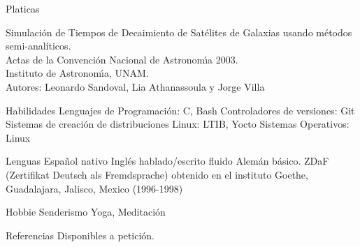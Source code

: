 \documentclass{resume}
\begin{document}
\begin{category}{Platicas}

\citembullet Simulaci\'on de Tiempos de Decaimiento de Sat\'elites de Galaxias usando m\'etodos semi-anal\'{i}ticos.\\
Actas de la Convenci\'on Nacional de Astronom\'{\i}a 2003.\\
Instituto de Astronom\'{\i}a, UNAM. \\
Autores: Leonardo Sandoval, Lia Athanassoula y Jorge Villa
\end{category}

\begin{category}{Habilidades}
\citembullet Lenguajes de Programaci\'on: C, Bash
\citembullet Controladores de versiones: Git
\citembullet Sistemas de creaci\'on de distribuciones Linux: LTIB, Yocto
\citembullet Sistemas Operativos: Linux
\end{category}

\begin{category}{Lenguas}
\citembullet Espa\~nol nativo
\citembullet Ingl\'es hablado/escrito fluido
\citembullet Alem\'an b\'asico. ZDaF (Zertifikat Deutsch als Fremdsprache) obtenido en el instituto Goethe, Guadalajara, Jalisco, Mexico (1996-1998)
\end{category}

\begin{category}{Hobbie}
\citembullet Senderismo
\citembullet Yoga, Meditaci\'on
\end{category}

\begin{category}{Referencias} 
\citemnobullet Disponibles a petici\'on.
\end{category}
\end{document}
